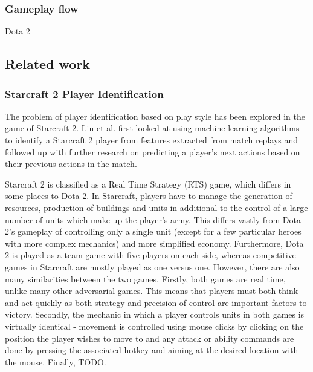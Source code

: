 \documentclass[Report.tex]{subfiles}
\begin{document}


\subsubsection{Gameplay flow}



Dota 2

\subsection{Related work}

\subsubsection{Starcraft 2 Player Identification}
The problem of player identification based on play style has been explored in the game of Starcraft 2. Liu et al. \cite{starcraft-identification} first looked at using machine learning algorithms to identify a Starcraft 2 player from features extracted from match replays and followed up with further research \cite{starcraft-actions} on predicting a player's next actions based on their previous actions in the match. 

Starcraft 2 is classified as a Real Time Strategy (RTS) game, which differs in some places to Dota 2. In Starcraft, players have to manage the generation of resources, production of buildings and units in additional to the control of a large number of units which make up the player's army. This differs vastly from Dota 2's gameplay of controlling only a single unit (except for a few particular heroes with more complex mechanics) and more simplified economy. Furthermore, Dota 2 is played as a team game with five players on each side, whereas competitive games in Starcraft are mostly played as one versus one. However, there are also many similarities between the two games. Firstly, both games are real time, unlike many other adversarial games. This means that players must both think and act quickly as both strategy and precision of control are important factors to victory. Secondly, the mechanic in which a player controls units in both games is virtually identical - movement is controlled using mouse clicks by clicking on the position the player wishes to move to and any attack or ability commands are done by pressing the associated hotkey and aiming at the desired location with the mouse. Finally, TODO.
\end{document}
